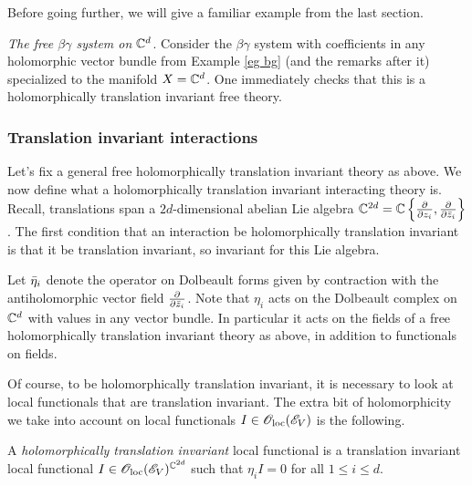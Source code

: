 \documentclass[10pt]{amsart}
\begin{document}
Before going further, we will give a familiar example from the last section.

\begin{eg}\label{eg bg affine} {\em The free $\beta\gamma$ system on $\mathbb C^d$}.
Consider the $\beta\gamma$ system with coefficients in any holomorphic vector bundle from Example \ref{eg bg} (and the remarks after it) specialized to the manifold $X = \mathbb C^d$.
One immediately checks that this is a holomorphically translation invariant free theory.
\end{eg}


\subsubsection{Translation invariant interactions}

Let's fix a general free holomorphically translation invariant theory as above.
We now define what a holomorphically translation invariant interacting theory is.
Recall, translations span a $2d$-dimensional abelian Lie algebra $\mathbb C^{2d} = \mathbb C\left\{\frac{\partial}{\partial z_i}, \frac{\partial}{\partial \Bar{z}_i}\right\}$. 
The first condition that an interaction be holomorphically translation invariant is that it be translation invariant, so invariant for this Lie algebra.

Let $\Bar{\eta}_i$ denote the operator on Dolbeault forms given by contraction with the antiholomorphic vector field $\frac{\partial}{\partial \Bar{z}_i}$. 
Note that $\eta_i$ acts on the Dolbeault complex on $\mathbb C^d$ with values in any vector bundle.
In particular it acts on the fields of a free holomorphically translation invariant theory as above, in addition to functionals on fields.

Of course, to be holomorphically translation invariant, it is necessary to look at local functionals that are translation invariant.
The extra bit of holomorphicity we take into account on local functionals $I \in {\mathscr O}_{\rm loc}(\mathscr E_V)$ is the following.

\begin{dfn}
A {\em holomorphically translation invariant} local functional is a translation invariant local functional $I \in {\mathscr O}_{\rm loc}(\mathscr E_V)^{\mathbb C^{2d}}$ such that $\eta_i I = 0$ for all $1 \leq i \leq d$. 
\end{dfn}
\end{document}
